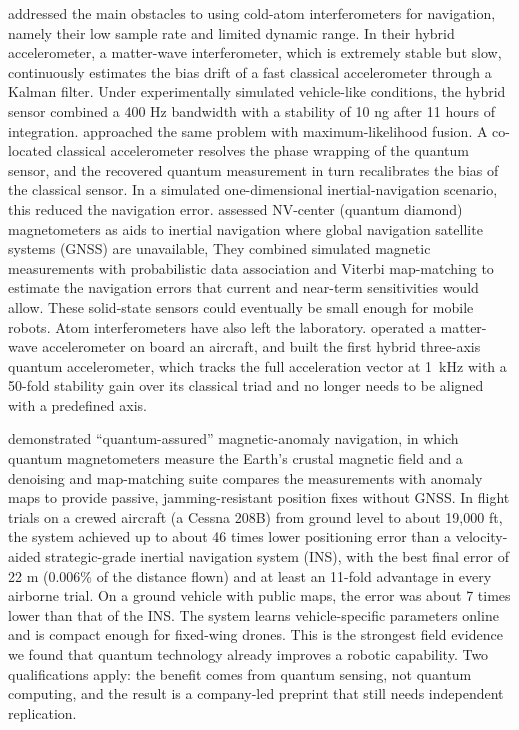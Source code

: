 \documentclass[acmsmall,screen,review]{acmart}
\begin{document}
\citet{Cheiney2018} addressed the main obstacles to using cold-atom interferometers for navigation, namely their low sample rate and limited dynamic range. In their hybrid accelerometer, a matter-wave interferometer, which is extremely stable but slow, continuously estimates the bias drift of a fast classical accelerometer through a Kalman filter. Under experimentally simulated vehicle-like conditions, the hybrid sensor combined a 400 Hz bandwidth with a stability of 10 ng after 11 hours of integration. \citet{Wang2021} approached the same problem with maximum-likelihood fusion. A co-located classical accelerometer resolves the phase wrapping of the quantum sensor, and the recovered quantum measurement in turn recalibrates the bias of the classical sensor. In a simulated one-dimensional inertial-navigation scenario, this reduced the navigation error. \citet{Wang2023} assessed NV-center (quantum diamond) magnetometers as aids to inertial navigation where global navigation satellite systems (GNSS) are unavailable, They combined simulated magnetic measurements with probabilistic data association and Viterbi map-matching to estimate the navigation errors that current and near-term sensitivities would allow. These solid-state sensors could eventually be small enough for mobile robots. Atom interferometers have also left the laboratory. \citet{Geiger2011} operated a matter-wave accelerometer on board an aircraft, and \citet{Templier2022} built the first hybrid three-axis quantum accelerometer, which tracks the full acceleration vector at 1~kHz with a 50-fold stability gain over its classical triad and no longer needs to be aligned with a predefined axis.

\citet{Muradoglu2025} demonstrated ``quantum-assured'' magnetic-anomaly navigation, in which quantum magnetometers measure the Earth's crustal magnetic field and a denoising and map-matching suite compares the measurements with anomaly maps to provide passive, jamming-resistant position fixes without GNSS. In flight trials on a crewed aircraft (a Cessna 208B) from ground level to about 19,000 ft, the system achieved up to about 46 times lower positioning error than a velocity-aided strategic-grade inertial navigation system (INS), with the best final error of 22 m (0.006\% of the distance flown) and at least an 11-fold advantage in every airborne trial. On a ground vehicle with public maps, the error was about 7 times lower than that of the INS. The system learns vehicle-specific parameters online and is compact enough for fixed-wing drones. This is the strongest field evidence we found that quantum technology already improves a robotic capability. Two qualifications apply: the benefit comes from quantum sensing, not quantum computing, and the result is a company-led preprint that still needs independent replication.
\end{document}
